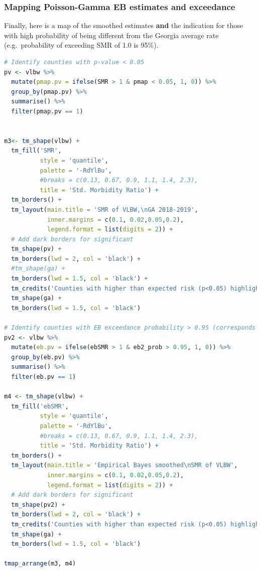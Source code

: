 \documentclass[
]{book}
\begin{document}
\hypertarget{mapping-poisson-gamma-eb-estimates-and-exceedance}{%
\subsubsection{Mapping Poisson-Gamma EB estimates and exceedance}\label{mapping-poisson-gamma-eb-estimates-and-exceedance}}

Finally, here is a map of the smoothed estimates \textbf{and} the indication for those with high probability of being different from the Georgia average rate (e.g.~probability of exceeding SMR of 1.0 is 95\%).

\begin{lstlisting}[language=R]
# Identify counties with p-value < 0.05
pv <- vlbw %>%
  mutate(pmap.pv = ifelse(SMR > 1 & pmap < 0.05, 1, 0)) %>%
  group_by(pmap.pv) %>%
  summarise() %>%
  filter(pmap.pv == 1)


m3<- tm_shape(vlbw) +
  tm_fill('SMR',
          style = 'quantile',
          palette = '-RdYlBu',
          #breaks = c(0.13, 0.67, 0.9, 1.1, 1.4, 2.3),
          title = 'Std. Morbidity Ratio') + 
  tm_borders() +
  tm_layout(main.title = 'SMR of VLBW,\nGA 2018-2019',
            inner.margins = c(0.1, 0.02,0.05,0.2),
            legend.format = list(digits = 2)) +
  # Add dark borders for significant
  tm_shape(pv) +
  tm_borders(lwd = 2, col = 'black') +
  #tm_shape(ga) + 
  tm_borders(lwd = 1.5, col = 'black') +
  tm_credits('Counties with higher than expected risk (p<0.05) highlighted with dark borders')+
  tm_shape(ga) +
  tm_borders(lwd = 1.5, col = 'black')

# Identify counties with EB exceedance probability > 0.95 (corresponds to p<0.05)
pv2 <- vlbw %>%
  mutate(eb.pv = ifelse(ebSMR > 1 & eb2_prob > 0.95, 1, 0)) %>%
  group_by(eb.pv) %>%
  summarise() %>%
  filter(eb.pv == 1)

m4 <- tm_shape(vlbw) +
  tm_fill('ebSMR',
          style = 'quantile',
          palette = '-RdYlBu',
          #breaks = c(0.13, 0.67, 0.9, 1.1, 1.4, 2.3),
          title = 'Std. Morbidity Ratio') + 
  tm_borders() +
  tm_layout(main.title = 'Empirical Bayes smoothed\nSMR of VLBW',
            inner.margins = c(0.1, 0.02,0.05,0.2),
            legend.format = list(digits = 2)) +
  # Add dark borders for significant
  tm_shape(pv2) +
  tm_borders(lwd = 2, col = 'black') +
  tm_credits('Counties with higher than expected risk (p<0.05) highlighted with dark borders')+
  tm_shape(ga) +
  tm_borders(lwd = 1.5, col = 'black')

tmap_arrange(m3, m4)
\end{lstlisting}
\end{document}
